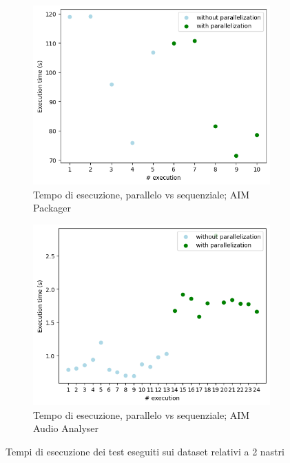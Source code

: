 \begin{figure}[h]
\begin{subfigure}{0.49\textwidth}
         \label{fig:grafico-distribuzione-tempo-audioanalyser}
     \end{subfigure}
     \par\bigskip
     \begin{subfigure}{0.49\textwidth}
         \centering
         \includegraphics[width=\textwidth]{img/packager-scatter-parallelization.png}
         \caption{Tempo di esecuzione, parallelo vs sequenziale; \ac{AIM} Packager}
         \label{fig:grafico-parallelo-vs-sequenziale-packager}
     \end{subfigure}
     \hfill
     \begin{subfigure}{0.49\textwidth}
         \centering
         \includegraphics[width=\textwidth]{img/audioanalyser-scatter-parallelization.png}
         \caption{Tempo di esecuzione, parallelo vs sequenziale; \ac{AIM} Audio Analyser}
         \label{fig:grafico-parallelo-vs-sequenziale-audioanalyser}
     \end{subfigure}
        \caption{Tempi di esecuzione dei test eseguiti sui dataset relativi a 2 nastri}
        \label{fig:test-grafici-tempo}
\end{figure}

